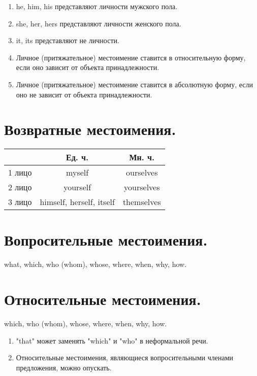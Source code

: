 \documentclass[oneside]{book}
\begin{document}
	\begin{enumerate}
		\item he, him, his представляют личности мужского пола.
		
		\item she, her, hers представляют личности женского пола.
		
		\item it, its представляют не личности.
		
		\item Личное (притяжательное) местоимение
		ставится в относительную форму,
		если оно зависит от объекта
		принадлежности.

		\item Личное (притяжательное) местоимение
		ставится в абсолютную форму,
		если оно не зависит от объекта
		принадлежности.
	\end{enumerate}

	\section{Возвратные местоимения.}
	\begin{center}
		\begin{tabular}{|c|c|c|}
			\hline

			& Ед. ч. & Мн. ч.
			\\
			\hline

			1 лицо & myself & ourselves
			\\
			\hline

			2 лицо & yourself & yourselves
			\\
			\hline

			3 лицо & himself, herself, itself & themselves
			\\
			\hline
		\end{tabular}
	\end{center}

	\section{Вопросительные местоимения.}
	what, which, who (whom), whose,
	where, when, why, how.

	\section{Относительные местоимения.}
	which, who (whom), whose,
	where, when, why, how.

	\begin{enumerate}
		\item "that" может заменять "which" и "who"
		в неформальной речи.
		
		\item Относительные местоимения,
		являющиеся вопросительными членами
		предложения, можно опускать.
	\end{enumerate}
\end{document}
